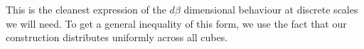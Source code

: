 \documentclass[usenames,dvipsnames]{article}
\theoremstyle{plain}
\newtheorem{corollary}{Corollary}
\theoremstyle{plain}
\begin{document}



This is the cleanest expression of the $d \beta$ dimensional behaviour at discrete scales we will need. To get a general inequality of this form, we use the fact that our construction distributes uniformly across all cubes.
\end{document}
